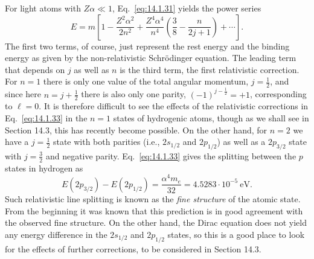 For light atoms with $Z\alpha\ll1$, Eq.~\eqref{eq:14.1.31} yields the power
series
\begin{equation}
  E=m\left[1-\frac{Z^2\alpha^2}{2n^2}
  +\frac{Z^4\alpha^4}{n^4}\left(\frac38-\frac{n}{2j+1}\right)+\cdots\right].
  \tag{14.1.33}\label{eq:14.1.33}
\end{equation}
The first two terms, of course, just represent the rest energy and the binding
energy as given by the non-relativistic Schr\"odinger equation. The leading
term that depends on $j$ as well as $n$ is the third term, the first
relativistic correction. For $n=1$ there is only one value of the total
angular momentum, $j=\frac12$, and since here $n=j+\frac12$ there is also only
one parity, $(-1)^{j-\frac12}=+1$, corresponding to $\ell=0$. It is therefore
difficult to see the effects of the relativistic corrections in
Eq.~\eqref{eq:14.1.33} in the $n=1$ states of hydrogenic atoms, though as we
shall see in Section 14.3, this has recently become possible. On the other
hand, for $n=2$ we have a $j=\frac12$ state with both parities (i.e.,
$2s_{1/2}$ and $2p_{1/2}$) as well as a $2p_{3/2}$ state with $j=\frac32$ and
negative parity. Eq.~\eqref{eq:14.1.33} gives the splitting between the $p$
states in hydrogen as
\begin{equation}
  E(2p_{3/2})-E(2p_{1/2})=\frac{\alpha^4m_e}{32}
  =4.5283\cdot10^{-5}\ \mathrm{eV}.
  \tag{14.1.34}\label{eq:14.1.34}
\end{equation}
Such relativistic line splitting is known as the \emph{fine structure} of the
atomic state. From the beginning it was known that this prediction is in good
agreement with the observed fine structure. On the other hand, the Dirac
equation does not yield any energy difference in the $2s_{1/2}$ and $2p_{1/2}$
states, so this is a good place to look for the effects of further corrections,
to be considered in Section 14.3.

